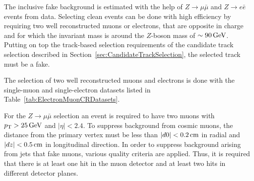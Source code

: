 The inclusive fake background is estimated with the help of $Z\rightarrow\mu\bar{\mu}$ and $Z\rightarrow e\bar{e}$ events from data.
Selecting clean \Zlep events can be done with high efficiency by requiring two well reconstructed muons or electrons, that are opposite in charge and for which the invariant mass is around the $Z$-boson mass of $\sim90\,\text{Ge}\kern-0.06667em\text{V}$.
Putting on top the track-based selection requirements of the candidate track selection described in Section~\ref{sec:CandidateTrackSelection}, the selected track must be a fake.

The selection of two well reconstructed muons and electrons is done with the single-muon and single-electron datasets listed in Table~\ref{tab:ElectronMuonCRDatasets}.
\renewcommand{\arraystretch}{1.5}
\begin{table}[!h]
\centering
\caption{Datasets used for the determination of the fake rate.}
\label{tab:ElectronMuonCRDatasets}
\end{table}  
For the $Z\rightarrow\mu\bar{\mu}$ selection an event is required to have two muons with $p_{\text{T}}>25\,\text{Ge}\kern-0.06667em\text{V}$ and $|\eta|<2.4$.
To suppress background from cosmic muons, the distance from the primary vertex must be less than $|d0|<0.2\,\text{cm}$ in radial and $|dz|<0.5\,\text{cm}$ in longitudinal direction.
In order to suppress background arising from jets that fake muons, various quality criteria are applied. 
Thus, it is required that there is at least one hit in the muon detector and at least two hits in different detector planes.   

